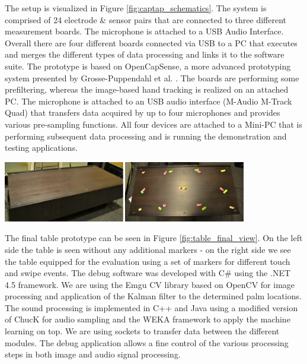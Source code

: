 The setup is visualized in Figure \ref{fig:captap_schematics}. The system is comprised of 24 electrode \& sensor pairs that are connected to three different measurement boards. The microphone is attached to a USB Audio Interface. Overall there are four different boards connected via USB to a  PC that executes and merges the different types of data processing and links it to the software suite. The prototype is based on OpenCapSense, a more advanced prototyping system presented by Grosse-Puppendahl et al. \cite{grosse2013opencapsense}. The boards are performing some prefiltering, whereas the image-based hand tracking is realized on an attached PC. The microphone is attached to an USB audio interface (M-Audio M-Track Quad) that transfers data acquired by up to four microphones and provides various pre-sampling functions. All four devices are attached to a Mini-PC that is performing subsequent data processing and is running the demonstration and testing applications. 
 
\begin{minipage}{\linewidth}
\centering
\includegraphics[width=0.8\textwidth]{images/table_final_view}
\label{fig:table_final_view}
\end{minipage}

The final table prototype can be seen in Figure \ref{fig:table_final_view}. On the left side the table is seen without any additional markers - on the right side we see the table equipped for the evaluation using a set of markers for different touch and swipe events. The debug software was developed with C\# using the .NET 4.5 framework. We are using the Emgu CV library based on OpenCV for image processing and application of the Kalman filter to the determined palm locations. The sound processing is implemented in C++ and Java using a modified version of ChucK for audio sampling and the WEKA framework to apply the machine learning on top. We are using sockets to transfer data between the different modules. The debug application allows a fine control of the various processing steps in both image and audio signal processing.

